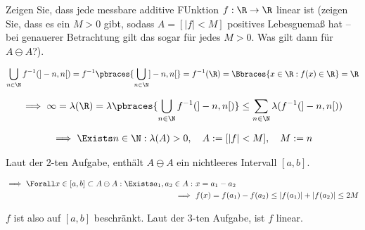 
\begin{exercise}

Zeigen Sie, dass jede messbare additive FUnktion $f: \R \to \R$ linear ist (zeigen Sie, dass es ein $M > 0$ gibt, sodass $A = [|f| < M]$ positives Lebesguemaß hat -- bei genauerer Betrachtung gilt das sogar für jedes $M > 0$. Was gilt dann für $A \ominus A$?).

\end{exercise}


\begin{solution}

\begin{align*}
    \bigcup_{n \in \N}
        f^{-1}(]-n, n[)
    =
    f^{-1} \pbraces{\bigcup_{n \in \N} ]-n, n[}
    =
    f^{-1}(\R)
    =
    \Bbraces{x \in \R: f(x) \in \R}
    =
    \R
\end{align*}

\begin{align*}
    \implies
    \infty
    =
    \lambda(\R)
    =
    \lambda \pbraces{\bigcup_{n \in \N} f^{-1}(]-n, n[)}
    \leq
    \sum_{n \in \N}
        \lambda(f^{-1}(]-n, n[))
\end{align*}

\begin{align*}
    \implies
    \Exists n \in \N:
        \lambda(A) > 0,
        \quad
        A := [|f| < M],
        \quad
        M := n    
\end{align*}

Laut der $2$-ten Aufgabe, enthält $A \ominus A$ ein nichtleeres Intervall $[a, b]$.

\begin{align*}
    \implies
    \Forall x \in [a, b] \subset A \ominus A:
        \Exists a_1, a_2 \in A:
            & ~
            x = a_1 - a_2 \\
        \implies & ~
        f(x) = f(a_1) - f(a_2) \leq |f(a_1)| + |f(a_2)| \leq 2 M
\end{align*}

$f$ ist also auf $[a, b]$ beschränkt.
Laut der $3$-ten Aufgabe, ist $f$ linear.

\end{solution}

